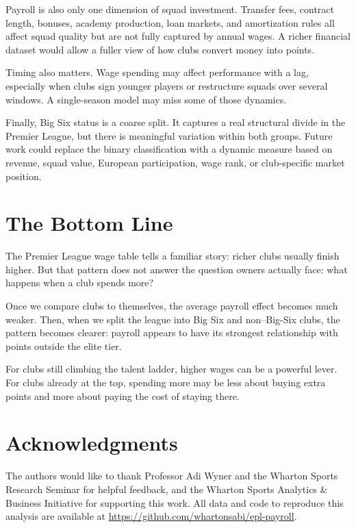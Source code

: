 \documentclass[12pt]{article}
\begin{document}
Payroll is also only one dimension of squad investment. Transfer fees, contract length, bonuses, academy production, loan markets, and amortization rules all affect squad quality but are not fully captured by annual wages. A richer financial dataset would allow a fuller view of how clubs convert money into points.

Timing also matters. Wage spending may affect performance with a lag, especially when clubs sign younger players or restructure squads over several windows. A single-season model may miss some of those dynamics.

Finally, Big Six status is a coarse split. It captures a real structural divide in the Premier League, but there is meaningful variation within both groups. Future work could replace the binary classification with a dynamic measure based on revenue, squad value, European participation, wage rank, or club-specific market position.

\section{The Bottom Line}

The Premier League wage table tells a familiar story: richer clubs usually finish higher. But that pattern does not answer the question owners actually face: what happens when a club spends more?

Once we compare clubs to themselves, the average payroll effect becomes much weaker. Then, when we split the league into Big Six and non--Big-Six clubs, the pattern becomes clearer: payroll appears to have its strongest relationship with points outside the elite tier.

For clubs still climbing the talent ladder, higher wages can be a powerful lever. For clubs already at the top, spending more may be less about buying extra points and more about paying the cost of staying there.

\section{Acknowledgments}

The authors would like to thank Professor Adi Wyner and the Wharton Sports Research Seminar for helpful feedback, and the Wharton Sports Analytics \& Business Initiative for supporting this work. All data and code to reproduce this analysis are available at \href{https://github.com/whartonsabi/epl-payroll}{https://github.com/whartonsabi/epl-payroll}.
\end{document}
